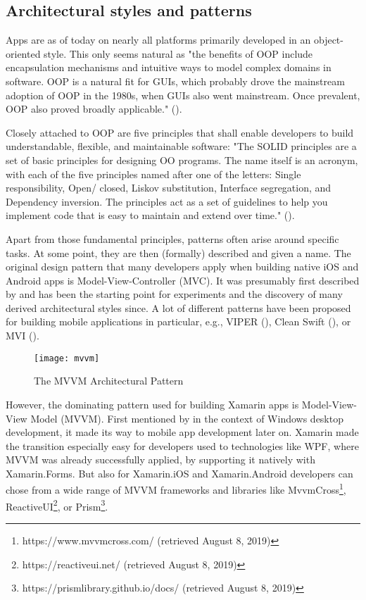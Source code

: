 \subsection{Architectural styles and patterns}

Apps are as of today on nearly all platforms primarily developed in an object-oriented style. This only seems natural as "the benefits of OOP include encapsulation mechanisms and intuitive ways to model complex domains in software. OOP is a natural fit for GUIs, which probably drove the mainstream adoption of OOP in the 1980s, when GUIs also went mainstream. Once prevalent, OOP also proved broadly applicable." (\cite{wampler_guest_2010}).

Closely attached to OOP are five principles that shall enable developers to build understandable, flexible, and maintainable software: "The SOLID principles are a set of basic principles for designing OO programs. The name itself is an acronym, with each of the five principles named after one of the letters: Single responsibility, Open/ closed, Liskov substitution, Interface segregation, and Dependency inversion. The principles act as a set of guidelines to help you implement code that is easy to maintain and extend over time." (\cite[7]{warburton_object-oriented_2016}).

Apart from those fundamental principles, patterns often arise around specific tasks. At some point, they are then (formally) described and given a name. The original design pattern that many developers apply when building native iOS and Android apps is Model-View-Controller (MVC). It was presumably first described by \cite{krasner_description_1988} and has been the starting point for experiments and the discovery of many derived architectural styles since. A lot of different patterns have been proposed for building mobile applications in particular, e.g., VIPER (\cite{gilbert_architecting_2014}), Clean Swift (\cite{law_clean_2015}), or MVI (\cite{dorfmann_model-view-intent_2016}).

\begin{figure}[H]
\centering
\caption{The MVVM Architectural Pattern}
\label{fig:chasm}
\texttt{[image: mvvm]}
\end{figure}

However, the dominating pattern used for building Xamarin apps is Model-View-View Model (MVVM). First mentioned by \cite{gossman_introduction_2005} in the context of Windows desktop development, it made its way to mobile app development later on. Xamarin made the transition especially easy for developers used to technologies like WPF, where MVVM was already successfully applied, by supporting it natively with Xamarin.Forms. But also for Xamarin.iOS and Xamarin.Android developers can chose from a wide range of MVVM frameworks and libraries like MvvmCross\footnote{https://www.mvvmcross.com/ (retrieved August 8, 2019)}, ReactiveUI\footnote{https://reactiveui.net/ (retrieved August 8, 2019)}, or Prism\footnote{https://prismlibrary.github.io/docs/ (retrieved August 8, 2019)}.
